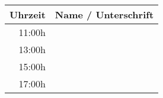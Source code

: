 \documentclass[10pt,a4paper]{scrartcl}
\begin{document}
\begin{tabular}{ | r | p{15cm} |}
\hline
\textbf{Uhrzeit} & \textbf{Name / Unterschrift} \\ \hline
11:00h & \\ \hline
13:00h & \\ \hline
15:00h & \\ \hline
17:00h & \\ \hline
\end{tabular}
\end{document}
